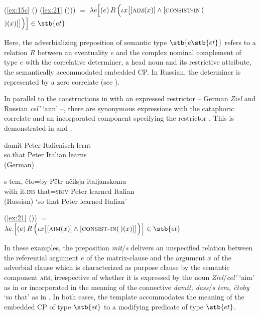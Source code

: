\documentclass[output=paper,
colorlinks,
citecolor=brown,
newtxmath
]{langscibook}
\begin{document}
\ea\label{ex:24}
 \Big(\ref{ex:15c} () \big(\ref{ex:21} ()\big)\Big) $=$ \newline
$\lambda e \Big[(e) \, R \, \Big(\iota x \big[[\textsc{aim} (x)] \wedge [\textsc{consist-in} \, ($$) (x)]\big]\Big)\Big] \in \stb{et}$
\z

\noindent Here, the adverbializing preposition of semantic type $\stb{e\stb{et}}$ refers to a relation $R$ between an eventuality $e$ and the complex nominal complement of type $e$ with the correlative determiner, a head noun and its restrictive attribute, the semantically accommodated embedded CP. In Russian, the determiner is represented by a zero correlate (see ).

In parallel to the constructions in  with an expressed restrictor -- German \textit{Ziel} and Russian \textit{cel'} `aim' --, there are synonymous expressions with the cataphoric correlate and an incorporated component specifying the restrictor \citep{Zimmermann2019c}. This is demonstrated in  and .

\ea\label{ex:25}
    \ea\gll damit Peter Italienisch lernt \label{ex:25a} \\
    so.that Peter Italian learns\\ \hfill (German)

    \ex\gll s tem, čto=by Pëtr učilsja italjanskomu \label{ex:25b} \\
    with it.\textsc{ins} that=\textsc{sbjv} Peter learned Italian \\ \hfill (Russian)
    \z
    \glt `so that Peter learned Italian'
\z

\ea\label{ex:26}
 \big(\ref{ex:21} ()\big) $=$\\
$\lambda e. \Big[(e) \, R \, \Big(\iota x \big[[\textsc{aim} (x)] \wedge [\textsc{consist-in} ($$) (x)]\big]\Big)\Big] \in \stb{et}$
\z

\noindent In these examples, the preposition \textit{mit}/\textit{s} delivers an unspecified relation between the referential argument $e$ of the matrix-clause and the argument $x$ of the adverbial clause which is characterized as purpose clause by the semantic component \textsc{aim}, irrespective of whether it is expressed by the noun \textit{Ziel}/\textit{cel'} `aim' as in  or incorporated in the meaning of the connective \textit{damit, dass}/\textit{s tem, čtoby} `so that' as in . In both cases, the template  accommodates the meaning of the embedded CP of type $\stb{st}$ to a modifying predicate of type $\stb{et}$.
\end{document}
